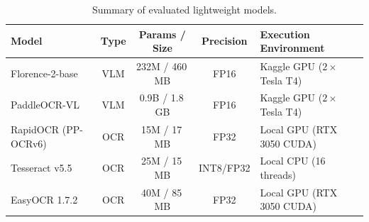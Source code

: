 \begin{table}[H]
    \centering
    \caption{Summary of evaluated lightweight models.}
    \label{tab:models}
    \footnotesize
    \renewcommand{\arraystretch}{0.85}
    \begin{tabularx}{\columnwidth}{l c c c >{\raggedright\arraybackslash}X}
        \toprule
        \textbf{Model} & \textbf{Type} & \textbf{Params / Size} & \textbf{Precision} & \textbf{Execution Environment} \\
        \midrule
        Florence-2-base & VLM & 232M / 460\,MB & FP16 & Kaggle GPU ($2\times$ Tesla T4) \\
        PaddleOCR-VL & VLM & 0.9B / 1.8\,GB & FP16 & Kaggle GPU ($2\times$ Tesla T4) \\
        RapidOCR (PP-OCRv6) & OCR & 15M / 17\,MB & FP32 & Local GPU (RTX 3050 CUDA) \\
        Tesseract v5.5 & OCR & 25M / 15\,MB & INT8/FP32 & Local CPU (16 threads) \\
        EasyOCR 1.7.2 & OCR & 40M / 85\,MB & FP32 & Local GPU (RTX 3050 CUDA) \\
        \bottomrule
    \end{tabularx}
\end{table}

